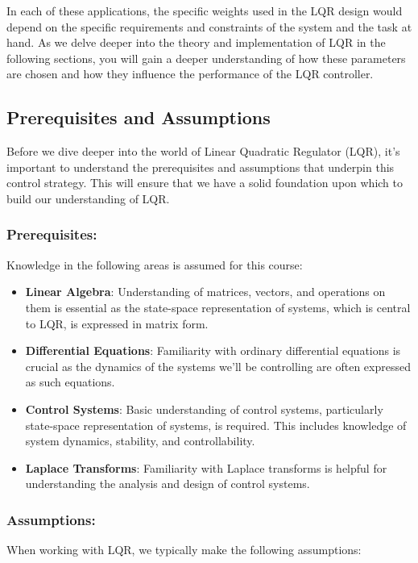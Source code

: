 \documentclass[11pt,twocolumn,twoside,lineno]{pnas-new}
\begin{document}
In each of these applications, the specific weights used in the LQR design would depend on the specific requirements and constraints of the system and the task at hand. As we delve deeper into the theory and implementation of LQR in the following sections, you will gain a deeper understanding of how these parameters are chosen and how they influence the performance of the LQR controller.

\subsection{Prerequisites and Assumptions}
Before we dive deeper into the world of Linear Quadratic Regulator (LQR), it's important to understand the prerequisites and assumptions that underpin this control strategy. This will ensure that we have a solid foundation upon which to build our understanding of LQR.

\subsubsection{Prerequisites:}
Knowledge in the following areas is assumed for this course:

\begin{itemize}
       \item \textbf{Linear Algebra}: Understanding of matrices, vectors, and operations on them is essential as the state-space representation of systems, which is central to LQR, is expressed in matrix form.
       \item \textbf{Differential Equations}: Familiarity with ordinary differential equations is crucial as the dynamics of the systems we'll be controlling are often expressed as such equations.
       \item \textbf{Control Systems}: Basic understanding of control systems, particularly state-space representation of systems, is required. This includes knowledge of system dynamics, stability, and controllability.
       \item \textbf{Laplace Transforms}: Familiarity with Laplace transforms is helpful for understanding the analysis and design of control systems.
\end{itemize}

\subsubsection{Assumptions:}
When working with LQR, we typically make the following assumptions:
\end{document}
